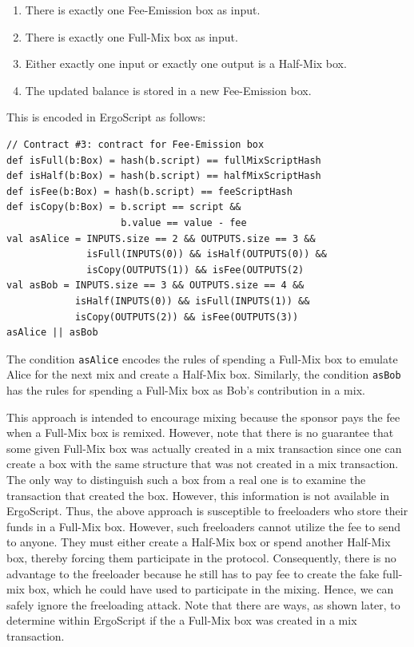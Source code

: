 \documentclass[runningheads]{llncs}
\newcommand{\langname}{ErgoScript\xspace}
\begin{document}
\begin{enumerate}
    \item There is exactly one Fee-Emission box as input.
    \item There is exactly one Full-Mix box as input.
    \item Either exactly one input or exactly one output is a Half-Mix box.
    \item The updated balance is stored in a new Fee-Emission box.
\end{enumerate}

This is encoded in \langname as follows:

{\small
\begin{Verbatim}[frame=single]
// Contract #3: contract for Fee-Emission box
def isFull(b:Box) = hash(b.script) == fullMixScriptHash 
def isHalf(b:Box) = hash(b.script) == halfMixScriptHash
def isFee(b:Box) = hash(b.script) == feeScriptHash
def isCopy(b:Box) = b.script == script && 
                    b.value == value - fee
val asAlice = INPUTS.size == 2 && OUTPUTS.size == 3 &&
              isFull(INPUTS(0)) && isHalf(OUTPUTS(0)) &&
              isCopy(OUTPUTS(1)) && isFee(OUTPUTS(2)
val asBob = INPUTS.size == 3 && OUTPUTS.size == 4 &&
            isHalf(INPUTS(0)) && isFull(INPUTS(1)) &&
            isCopy(OUTPUTS(2)) && isFee(OUTPUTS(3))
asAlice || asBob 
\end{Verbatim}
}

The condition \texttt{asAlice} encodes the rules of spending a Full-Mix box to emulate Alice for the next mix and create a Half-Mix box. Similarly, the condition \texttt{asBob} has the rules for spending a Full-Mix box as Bob's contribution in a mix. 

This approach is intended to encourage mixing because the sponsor pays the fee when a Full-Mix box is remixed. However, note that there is no guarantee that some given Full-Mix box was actually created in a mix transaction since one can create a box with the same structure that was not created in a mix transaction. The only way to distinguish such a box from a real one is to examine the transaction that created the box. However, this information is not available in \langname. Thus, the above approach is susceptible to freeloaders who store their funds in a Full-Mix box. However, such freeloaders cannot utilize the fee to send to anyone. They must either create a Half-Mix box or spend another Half-Mix box, thereby forcing them participate in the protocol. Consequently, there is no advantage to the freeloader because he still has to pay fee to create the fake full-mix box, which he could have used to participate in the mixing. Hence, we can safely ignore the freeloading attack. Note that there are ways, as shown later, to determine within \langname if the a Full-Mix box was created in a mix transaction.
\end{document}

